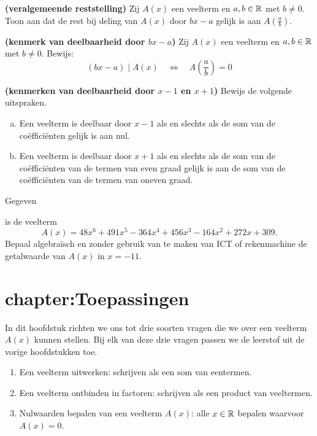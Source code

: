 \documentclass{ximera}
\begin{document}
\begin{Uitbreiding}
\begin{Oefening}
{\bf (veralgemeende reststelling)}
Zij $A(x)$ een veelterm en $a,b \in \mathbb{R}$ met $b \neq 0$. Toon aan dat de rest bij deling van $A(x)$ door $bx-a$ gelijk is aan $A\left(\frac{a}{b}\right)$.
\end{Oefening}

\begin{Oefening}
{\bf (kenmerk van deelbaarheid door $bx-a$)}
Zij $A(x)$ een veelterm en $a,b \in \mathbb{R}$ met $b \neq 0$. Bewijs:
\[
(bx-a) \mid A(x) \quad \Leftrightarrow \quad A\left(\frac{a}{b}\right) = 0
\]
\end{Oefening}

\begin{Oefening}
{\bf (kenmerken van deelbaarheid door $x-1$ en $x+1$)}
Bewijs de volgende uitspraken.
\begin{enumerate}[(a)]
\item
Een veelterm is deelbaar door $x-1$ als en slechts als de som van de co\"effici\"enten gelijk is aan nul.
\item
Een veelterm is deelbaar door $x+1$ als en slechts als de som van de co\"effici\"enten van de termen van even graad gelijk is aan de som van de co\"effici\"enten van de termen van oneven graad.
\end{enumerate}
\end{Oefening}
\end{Uitbreiding}

\begin{Oefening}\setcounter{enumi}{20}   
\hypertarget{oef3.20}{Gegeven} is de veelterm
\[
A(x) = 48x^6 + 491 x^5 - 364x^4 + 456x^3 - 164x^2 + 272x + 309.
\]
Bepaal algebra\"isch en zonder gebruik van te maken van ICT of rekenmachine de getalwaarde van $A(x)$ in $x = -11$. 
\end{Oefening}

\clearpage

\section{chapter:Toepassingen}

In dit hoofdstuk richten we ons tot drie soorten vragen die we over een veelterm $A(x)$ kunnen stellen. Bij elk van deze drie vragen passen we de leerstof uit de vorige hoofdstukken toe. 
\begin{enumerate}[(1)]
\item
Een veelterm uitwerken: schrijven als een som van eentermen. 
\item
Een veelterm ontbinden in factoren: schrijven als een product van veeltermen.
\item
Nulwaarden bepalen van een veelterm $A(x)$: alle $x \in \mathbb{R}$ bepalen waarvoor $A(x) = 0$. 
\end{enumerate}
\end{document}
